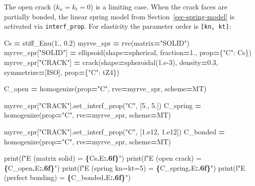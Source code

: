 \documentclass[
  a4paper,
  numbers=noendperiod,
  DIV=12]{scrreprt}
\newenvironment{Shaded}{\begin{snugshade}}{\end{snugshade}}
\newcommand{\BuiltInTok}[1]{#1}
\newcommand{\FloatTok}[1]{\textcolor[rgb]{0.00,0.00,0.81}{#1}}
\newcommand{\NormalTok}[1]{#1}
\newcommand{\OperatorTok}[1]{\textcolor[rgb]{0.81,0.36,0.00}{\textbf{#1}}}
\newcommand{\SpecialCharTok}[1]{\textcolor[rgb]{0.81,0.36,0.00}{\textbf{#1}}}
\newcommand{\SpecialStringTok}[1]{\textcolor[rgb]{0.31,0.60,0.02}{#1}}
\newcommand{\StringTok}[1]{\textcolor[rgb]{0.31,0.60,0.02}{#1}}
\begin{document}
The open crack (\(k_n=k_t=0\)) is a limiting case. When the crack faces
are partially bonded, the linear spring model from
Section~\ref{sec-spring-model} is activated via \texttt{interf\_prop}.
For elasticity the parameter order is \texttt{{[}kn,\ kt{]}}:

\begin{Shaded}
\begin{Highlighting}[]
\NormalTok{Cs }\OperatorTok{=}\NormalTok{ stiff\_Enu(}\FloatTok{1.}\NormalTok{, }\FloatTok{0.2}\NormalTok{)}
\NormalTok{myrve\_spr }\OperatorTok{=}\NormalTok{ rve(matrix}\OperatorTok{=}\StringTok{"SOLID"}\NormalTok{)}
\NormalTok{myrve\_spr[}\StringTok{"SOLID"}\NormalTok{] }\OperatorTok{=}\NormalTok{ ellipsoid(shape}\OperatorTok{=}\NormalTok{spherical, fraction}\OperatorTok{=}\FloatTok{1.}\NormalTok{, prop}\OperatorTok{=}\NormalTok{\{}\StringTok{"C"}\NormalTok{: Cs\})}
\NormalTok{myrve\_spr[}\StringTok{"CRACK"}\NormalTok{] }\OperatorTok{=}\NormalTok{ crack(shape}\OperatorTok{=}\NormalTok{spheroidal(}\FloatTok{1.e{-}3}\NormalTok{), density}\OperatorTok{=}\FloatTok{0.3}\NormalTok{,}
\NormalTok{                            symmetrize}\OperatorTok{=}\NormalTok{[ISO], prop}\OperatorTok{=}\NormalTok{\{}\StringTok{"C"}\NormalTok{: tZ4\})}

\NormalTok{C\_open   }\OperatorTok{=}\NormalTok{ homogenize(prop}\OperatorTok{=}\StringTok{"C"}\NormalTok{, rve}\OperatorTok{=}\NormalTok{myrve\_spr, scheme}\OperatorTok{=}\NormalTok{MT)}

\NormalTok{myrve\_spr[}\StringTok{"CRACK"}\NormalTok{].set\_interf\_prop(}\StringTok{"C"}\NormalTok{, [}\FloatTok{5.}\NormalTok{, }\FloatTok{5.}\NormalTok{])}
\NormalTok{C\_spring }\OperatorTok{=}\NormalTok{ homogenize(prop}\OperatorTok{=}\StringTok{"C"}\NormalTok{, rve}\OperatorTok{=}\NormalTok{myrve\_spr, scheme}\OperatorTok{=}\NormalTok{MT)}

\NormalTok{myrve\_spr[}\StringTok{"CRACK"}\NormalTok{].set\_interf\_prop(}\StringTok{"C"}\NormalTok{, [}\FloatTok{1.e12}\NormalTok{, }\FloatTok{1.e12}\NormalTok{])}
\NormalTok{C\_bonded }\OperatorTok{=}\NormalTok{ homogenize(prop}\OperatorTok{=}\StringTok{"C"}\NormalTok{, rve}\OperatorTok{=}\NormalTok{myrve\_spr, scheme}\OperatorTok{=}\NormalTok{MT)}

\BuiltInTok{print}\NormalTok{(}\SpecialStringTok{f"E (matrix solid)     = }\SpecialCharTok{\{}\NormalTok{Cs}\SpecialCharTok{.}\NormalTok{E}\SpecialCharTok{:.6f\}}\SpecialStringTok{"}\NormalTok{)}
\BuiltInTok{print}\NormalTok{(}\SpecialStringTok{f"E (open crack)       = }\SpecialCharTok{\{}\NormalTok{C\_open}\SpecialCharTok{.}\NormalTok{E}\SpecialCharTok{:.6f\}}\SpecialStringTok{"}\NormalTok{)}
\BuiltInTok{print}\NormalTok{(}\SpecialStringTok{f"E (spring kn=kt=5)   = }\SpecialCharTok{\{}\NormalTok{C\_spring}\SpecialCharTok{.}\NormalTok{E}\SpecialCharTok{:.6f\}}\SpecialStringTok{"}\NormalTok{)}
\BuiltInTok{print}\NormalTok{(}\SpecialStringTok{f"E (perfect bonding)  = }\SpecialCharTok{\{}\NormalTok{C\_bonded}\SpecialCharTok{.}\NormalTok{E}\SpecialCharTok{:.6f\}}\SpecialStringTok{"}\NormalTok{)}
\end{Highlighting}
\end{Shaded}
\end{document}
